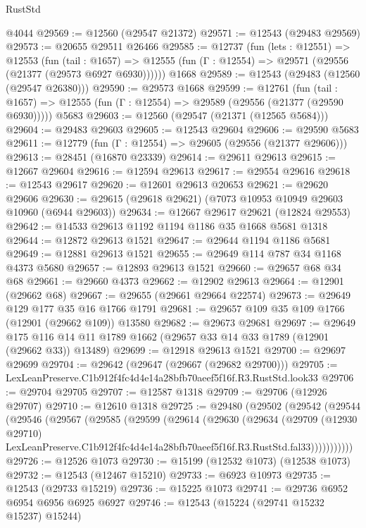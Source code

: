 \begin{lexlean}{RustStd}
\begin{coremodule}
    @4044
@29569 := @12560 (@29547 @21372)
@29571 := @12543 (@29483 @29569)
@29573 := @20655 @29511 @26466
@29585 := @12737
    (fun (lets : @12551) =>
    @12553
      (fun (tail : @1657) =>
      @12555 (fun (Γ : @12554) => @29571 (@29556 (@21377 (@29573 @6927 @6930))))))
    @1668
@29589 := @12543 (@29483 (@12560 (@29547 @26380)))
@29590 := @29573 @1668
@29599 := @12761
    (fun (tail : @1657) => @12555 (fun (Γ : @12554) => @29589 (@29556 (@21377 (@29590 @6930)))))
    @5683
@29603 := @12560 (@29547 (@21371 (@12565 @5684)))
@29604 := @29483 @29603
@29605 := @12543 @29604
@29606 := @29590 @5683
@29611 := @12779 (fun (Γ : @12554) => @29605 (@29556 (@21377 @29606)))
@29613 := @28451 (@16870 @23339)
@29614 := @29611 @29613
@29615 := @12667 @29604
@29616 := @12594 @29613
@29617 := @29554 @29616
@29618 := @12543 @29617
@29620 := @12601 @29613 @20653
@29621 := @29620 @29606
@29630 := @29615 (@29618 @29621) (@7073 @10953 @10949 @29603 @10960 (@6944 @29603))
@29634 := @12667 @29617 @29621 (@12824 @29553)
@29642 := @14533 @29613 @1192 @1194 @1186 @35 @1668 @5681 @1318
@29644 := @12872 @29613 @1521
@29647 := @29644 @1194 @1186 @5681
@29649 := @12881 @29613 @1521
@29655 := @29649 @114 @787 @34 @1168 @4373 @5680
@29657 := @12893 @29613 @1521
@29660 := @29657 @68 @34 @68
@29661 := @29660 @4373
@29662 := @12902 @29613
@29664 := @12901 (@29662 @68)
@29667 := @29655 (@29661 @29664 @22574)
@29673 := @29649 @129 @177 @35 @16 @1766 @1791
@29681 := @29657 @109 @35 @109 @1766 (@12901 (@29662 @109)) @13580
@29682 := @29673 @29681
@29697 := @29649
    @175
    @116
    @14
    @11
    @1789
    @1662
    (@29657 @33 @14 @33 @1789 (@12901 (@29662 @33)) @13489)
@29699 := @12918 @29613 @1521
@29700 := @29697 @29699
@29704 := @29642 (@29647 (@29667 (@29682 @29700)))
@29705 := LexLeanPreserve.C1b912f4fc4d4e14a28bfb70aeef5f16f.R3.RustStd.look33
@29706 := @29704 @29705
@29707 := @12587 @1318
@29709 := @29706 (@12926 @29707)
@29710 := @12610 @1318
@29725 := @29480
    (@29502
      (@29542
        (@29544
          (@29546
            (@29567
              (@29585
                (@29599
                  (@29614
                    (@29630
                      (@29634
                        (@29709
                          (@12930 @29710)
                          LexLeanPreserve.C1b912f4fc4d4e14a28bfb70aeef5f16f.R3.RustStd.fal33)))))))))))
@29726 := @12526 @1073
@29730 := @15199 (@12532 @1073) (@12538 @1073)
@29732 := @12543 (@12467 @15210)
@29733 := @6923 @10973
@29735 := @12543 (@29733 @15219)
@29736 := @15225 @1073
@29741 := @29736 @6952 @6954 @6956 @6925 @6927
@29746 := @12543 (@15224 (@29741 @15232 @15237) @15244)

\end{coremodule}
\end{lexlean}
